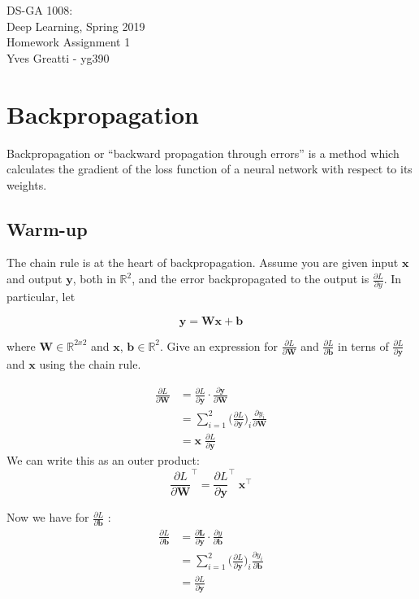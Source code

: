 \documentclass[11pt]{article}
\def\Rset{\mathbb{R}}
\newcommand{\0}{\mat{0}}
\newcommand{\matr}[1]{\bm{#1}}     %
\newcommand{\vect}[1]{\bm{#1}}     %
\begin{document}
\noindent DS-GA 1008:\\
Deep Learning, Spring 2019\\
Homework Assignment 1 \\
Yves Greatti - yg390\\

\section{Backpropagation}

Backpropagation or “backward propagation through errors” is a method which calculates the gradient of the loss function of a neural network with respect to its weights.

\subsection{Warm-up}
The chain rule is at the heart of backpropagation. Assume you are given input  $\vect{x}$ and output $\vect{y}$, both in $\Rset^2$, and the error backpropagated to the output is $\frac{ \partial L}{\partial y}$. In particular, let

\begin{equation*}
\vect{y} = \matr{W} \vect{x} + \vect{b}
\end{equation*}

where $\matr{W} \in \Rset^{2x2}$ and $\vect{x}$, $\vect{b} \in \Rset^2$. Give an expression for   $\frac{ \partial L}{\partial \matr{W}}$ and  $\frac{ \partial L}{\partial \vect{b}}$ in terns of $\frac{ \partial L}{\partial \vect{y}}$ and $\vect{x}$ using the chain rule.

\begin{align*}
	\frac{ \partial L}{\partial \matr{W}} &= \frac{ \partial L}{\partial \vect{y}} \cdot \frac{ \partial \vect{y}}{\partial \matr{W}}\\
	&= \sum_{i=1}^2  \Bigg( \frac{ \partial L}{\partial \vect{y}} \Bigg)_i  \frac{ \partial y_i}{\partial \matr{W}}\\
    &= \vect{x} \; \frac{ \partial L}{\partial \vect{y}}
\end{align*}
We can write this as an outer product:
\begin{equation*}
    \frac{ \partial L}{\partial \matr{W}}^\top = \frac{ \partial L}{\partial \vect{y}}^\top \; \vect{x}^{\top}
\end{equation*}

Now we have for  $\frac{ \partial L}{\partial \vect{b}}$ :
\begin{align*}
	\frac{ \partial L}{\partial \vect{b}} &= \frac{ \partial \vect{L}} {\partial \vect{y}} \cdot \frac{ \partial y}{\partial \vect{b}}  \\
	&= \sum_{i=1}^2 \Bigg( \frac{ \partial L}{\partial \vect{y}} \Bigg)_i \frac{ \partial y_i}{\partial \vect{b}}  \\
	&= \frac{ \partial L}{\partial \vect{y}} 
\end{align*}
\end{document}
